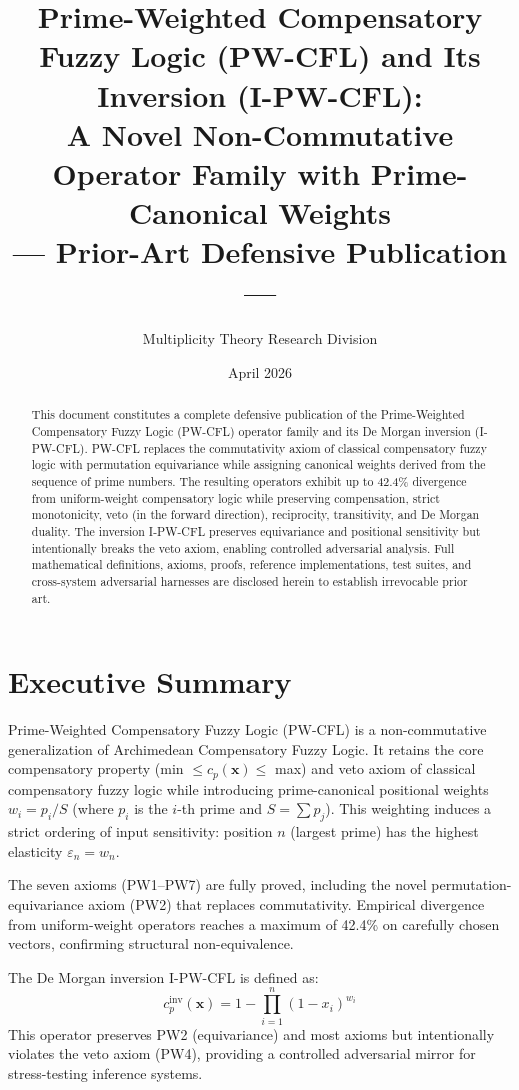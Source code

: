 \documentclass[11pt,a4paper]{article}
\title{Prime-Weighted Compensatory Fuzzy Logic (PW-CFL) and Its Inversion (I-PW-CFL): \\
A Novel Non-Commutative Operator Family with Prime-Canonical Weights \\
--- Prior-Art Defensive Publication ---}
\author{Multiplicity Theory Research Division}
\date{April 2026}
\begin{document}
\maketitle

\begin{abstract}
This document constitutes a complete defensive publication of the Prime-Weighted Compensatory Fuzzy Logic (PW-CFL) operator family and its De Morgan inversion (I-PW-CFL). PW-CFL replaces the commutativity axiom of classical compensatory fuzzy logic with permutation equivariance while assigning canonical weights derived from the sequence of prime numbers. The resulting operators exhibit up to 42.4\% divergence from uniform-weight compensatory logic while preserving compensation, strict monotonicity, veto (in the forward direction), reciprocity, transitivity, and De Morgan duality. The inversion I-PW-CFL preserves equivariance and positional sensitivity but intentionally breaks the veto axiom, enabling controlled adversarial analysis. Full mathematical definitions, axioms, proofs, reference implementations, test suites, and cross-system adversarial harnesses are disclosed herein to establish irrevocable prior art.
\end{abstract}

\section{Executive Summary}

Prime-Weighted Compensatory Fuzzy Logic (PW-CFL) is a non-commutative generalization of Archimedean Compensatory Fuzzy Logic. It retains the core compensatory property (min \(\leq c_p(\mathbf{x}) \leq\) max) and veto axiom of classical compensatory fuzzy logic while introducing prime-canonical positional weights \(w_i = p_i / S\) (where \(p_i\) is the \(i\)-th prime and \(S = \sum p_j\)). This weighting induces a strict ordering of input sensitivity: position \(n\) (largest prime) has the highest elasticity \(\varepsilon_n = w_n\).

The seven axioms (PW1--PW7) are fully proved, including the novel permutation-equivariance axiom (PW2) that replaces commutativity. Empirical divergence from uniform-weight operators reaches a maximum of 42.4\% on carefully chosen vectors, confirming structural non-equivalence.

The De Morgan inversion I-PW-CFL is defined as:
\[
c_p^{\text{inv}}(\mathbf{x}) = 1 - \prod_{i=1}^n (1 - x_i)^{w_i}
\]
This operator preserves PW2 (equivariance) and most axioms but intentionally violates the veto axiom (PW4), providing a controlled adversarial mirror for stress-testing inference systems.
\end{document}
